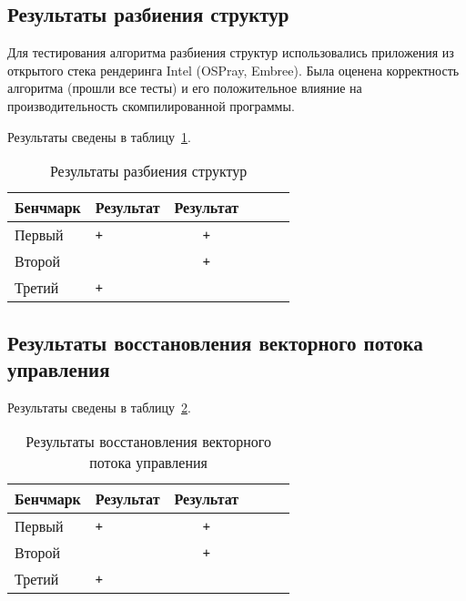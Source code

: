 \subsection{Результаты разбиения структур}\label{subsec:results/results/splitter}

Для тестирования алгоритма разбиения структур использовались приложения из открытого стека рендеринга Intel (OSPray, Embree). Была оценена корректность алгоритма (прошли все тесты) и его положительное влияние на производительность скомпилированной программы.

Результаты сведены в таблицу~\cref{tab:results/splitter}.

\begin{table}
    \centering
    \captionsetup{justification=centering}
    \caption{Результаты разбиения структур}\label{tab:results/splitter}
    \begin{tabular}{llc|llc}
        \toprule
        Бенчмарк & Результат & Результат \\
        \midrule
        Первый   & \verb|+|  & \verb|+|  \\
        Второй   & \verb| |  & \verb|+|  \\
        Третий   & \verb|+|  & \verb| |  \\
        \bottomrule
    \end{tabular}
\end{table}

\subsection{Результаты восстановления векторного потока управления}\label{subsec:results/results/simdcf}

Результаты сведены в таблицу~\cref{tab:results/simdcf}.

\begin{table}
    \centering
    \captionsetup{justification=centering}
    \caption{Результаты восстановления векторного потока управления}\label{tab:results/simdcf}
    \begin{tabular}{llc|llc}
        \toprule
        Бенчмарк & Результат & Результат \\
        \midrule
        Первый   & \verb|+|  & \verb|+|  \\
        Второй   & \verb| |  & \verb|+|  \\
        Третий   & \verb|+|  & \verb| |  \\
        \bottomrule
    \end{tabular}
\end{table}

